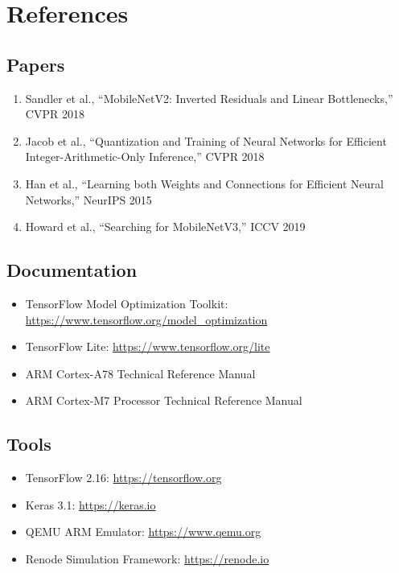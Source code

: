 \documentclass[10pt, a4paper]{article}
\begin{document}
\section*{References}

\subsection*{Papers}
\begin{enumerate}
    \item Sandler et al., ``MobileNetV2: Inverted Residuals and Linear Bottlenecks,'' CVPR 2018
    \item Jacob et al., ``Quantization and Training of Neural Networks for Efficient Integer-Arithmetic-Only Inference,'' CVPR 2018
    \item Han et al., ``Learning both Weights and Connections for Efficient Neural Networks,'' NeurIPS 2015
    \item Howard et al., ``Searching for MobileNetV3,'' ICCV 2019
\end{enumerate}

\subsection*{Documentation}
\begin{itemize}
    \item TensorFlow Model Optimization Toolkit: \url{https://www.tensorflow.org/model_optimization}
    \item TensorFlow Lite: \url{https://www.tensorflow.org/lite}
    \item ARM Cortex-A78 Technical Reference Manual
    \item ARM Cortex-M7 Processor Technical Reference Manual
\end{itemize}

\subsection*{Tools}
\begin{itemize}
    \item TensorFlow 2.16: \url{https://tensorflow.org}
    \item Keras 3.1: \url{https://keras.io}
    \item QEMU ARM Emulator: \url{https://www.qemu.org}
    \item Renode Simulation Framework: \url{https://renode.io}
\end{itemize}
\end{document}

